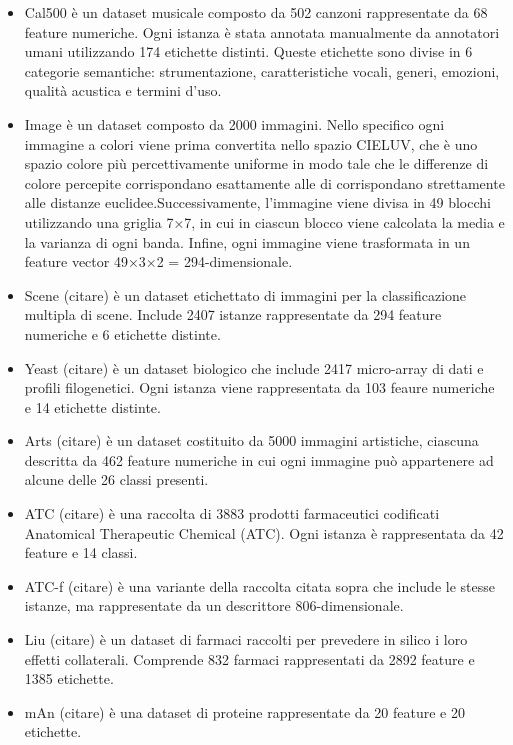 \begin{itemize} %

	\item Cal500 è un dataset musicale composto da 502 canzoni rappresentate da 68 feature numeriche. Ogni istanza è stata annotata manualmente da annotatori umani utilizzando 174 etichette distinti. Queste etichette sono divise in 6 categorie semantiche: strumentazione, caratteristiche vocali, generi, emozioni, qualità acustica e termini d'uso.
	
	\item Image è un dataset composto da 2000 immagini. Nello specifico ogni immagine a colori viene prima convertita nello spazio CIELUV, che è uno spazio colore più percettivamente  uniforme in modo tale che le differenze di colore percepite corrispondano esattamente alle di corrispondano strettamente alle distanze euclidee.Successivamente, l'immagine viene divisa in 49 blocchi utilizzando una griglia 7×7, in cui in ciascun blocco viene calcolata la media e la varianza di ogni banda. Infine, ogni immagine viene trasformata in un feature vector 49×3×2 = 294-dimensionale. 
	
	\item Scene (citare) è un dataset etichettato di immagini per la classificazione multipla di scene. Include 2407 istanze rappresentate da 294 feature numeriche e 6 etichette distinte.
	
	\item Yeast (citare) è un dataset biologico che include 2417 micro-array di dati e profili filogenetici. Ogni istanza viene rappresentata da 103 feaure numeriche e 14 etichette distinte. 
	
	\item Arts (citare) è un dataset costituito da 5000 immagini artistiche, ciascuna descritta da 462 feature numeriche in cui ogni immagine può appartenere ad alcune delle 26 classi presenti.
	
	\item ATC (citare) è una raccolta di 3883 prodotti farmaceutici codificati Anatomical Therapeutic Chemical (ATC). Ogni istanza è rappresentata da 42 feature e 14 classi.
	
	\item ATC-f (citare) è una variante della raccolta citata sopra che include le stesse istanze, ma rappresentate da un descrittore 806-dimensionale.
		
	\item Liu (citare) è un dataset di farmaci raccolti per prevedere in silico i loro effetti collaterali. Comprende 832 farmaci rappresentati da 2892 feature e 1385 etichette.
	
	\item mAn (citare) è una dataset di proteine rappresentate da 20 feature e 20 etichette.
	
\end{itemize}

